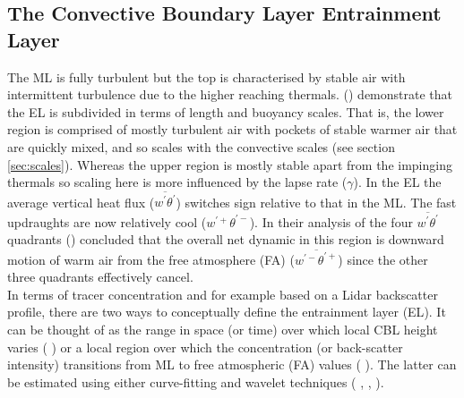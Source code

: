 \subsection{The Convective Boundary Layer Entrainment Layer}
\label{subsec:}

The \acs{ML} is fully turbulent but the top is characterised by stable air with intermittent turbulence due to the higher reaching thermals. \citeauthor{GarciaMellado} (\citeyear{GarciaMellado}) demonstrate that the \acs{EL} is subdivided in terms of length and buoyancy scales.  That is, the lower region is comprised of mostly turbulent air with pockets of stable warmer air that are quickly mixed, and so scales with the convective scales (see section \ref{sec:scales}). Whereas the upper region is mostly stable apart from the impinging thermals so scaling here is more influenced by the lapse rate ($\gamma$).  In the \acs{EL} the average vertical heat flux ($\overline{w^{'}\theta^{'}}$) switches sign relative to that in the \acs{ML}.  The fast updraughts are now relatively cool ($w^{'+}\theta^{'-}$).  In their analysis of the four $\overline{w^{'}\theta^{'}}$ quadrants \citeauthor{SullMoengStev} (\cite{SullMoengStev}) concluded that the overall net dynamic in this region is downward motion of warm air from the free atmosphere (\acs{FA}) ($\overline{w^{'-}\theta^{'+}}$) since the other three quadrants effectively cancel.\\

In terms of tracer concentration and for example based on a Lidar backscatter profile, there are two ways to conceptually define the entrainment layer (\acs{EL}).  It can be thought of as the range in space (or time) over which local \acs{CBL} height varies (\citeauthor{CrumStullEl} \citeyear{CrumStullEl}) or a local region over which the concentration (or back-scatter intensity) transitions from \acs{ML} to free atmospheric (\acs{FA}) values (\citeauthor{Traum11} \citeyear{Traum11}).  The latter can be estimated using either curve-fitting and wavelet techniques (\citeauthor{Traum11} \cite{Traum11}, \citeauthor{SteynBaldHoff} \cite{SteynBaldHoff}, \citeauthor{BrooksFowler2} \cite{BrooksFowler2}).\\

